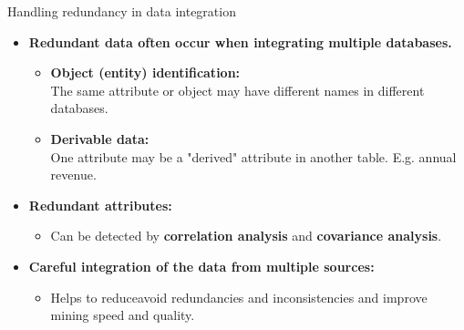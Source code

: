 \documentclass[aspectratio=169,t]{beamer}
\begin{document}
  { 
    \begin{frame}{Handling redundancy in data integration}
    \begin{itemize}
      \item \textbf{Redundant data often occur when integrating multiple databases.}
      \begin{itemize}
        \item \textbf{Object (entity) identification:} \\
              The same attribute or object may have different names in different databases.
        \item \textbf{Derivable data:}\\
              One attribute may be a "derived" attribute in another table. E.g. annual revenue.
      \end{itemize}
      \item \textbf{Redundant attributes:}
      \begin{itemize}
        \item Can be detected by \textbf{\color{airforceblue}correlation analysis} and \textbf{\color{airforceblue}covariance analysis}.
      \end{itemize}
      \item \textbf{Careful integration of the data from multiple sources:}
      \begin{itemize}
        \item Helps to reduce\/avoid redundancies and inconsistencies and improve mining speed and quality.
      \end{itemize}
    \end{itemize}
    \end{frame}
  }
\end{document}
